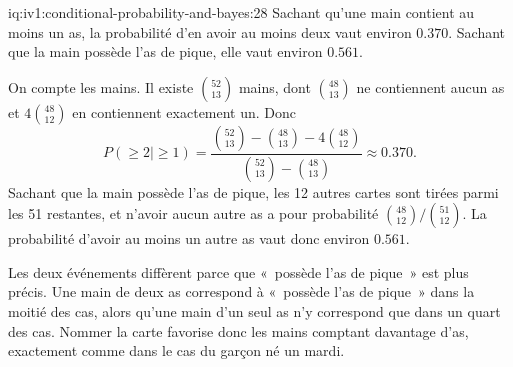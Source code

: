 \begin{solution}{iq:iv1:conditional-probability-and-bayes:28}
Sachant qu'une main contient au moins un as, la probabilité d'en avoir au moins deux vaut environ $0.370$. Sachant que la main possède l'as de pique, elle vaut environ $0.561$.

On compte les mains. Il existe $\binom{52}{13}$ mains, dont $\binom{48}{13}$ ne contiennent aucun as et $4\binom{48}{12}$ en contiennent exactement un. Donc
\[
P(\ge 2 \mid \ge 1) = \frac{\binom{52}{13} - \binom{48}{13} - 4\binom{48}{12}}{\binom{52}{13} - \binom{48}{13}} \approx 0.370.
\]
Sachant que la main possède l'as de pique, les 12 autres cartes sont tirées parmi les 51 restantes, et n'avoir aucun autre as a pour probabilité $\binom{48}{12}/\binom{51}{12}$. La probabilité d'avoir au moins un autre as vaut donc environ $0.561$.

Les deux événements diffèrent parce que «~possède l'as de pique~» est plus précis. Une main de deux as correspond à «~possède l'as de pique~» dans la moitié des cas, alors qu'une main d'un seul as n'y correspond que dans un quart des cas. Nommer la carte favorise donc les mains comptant davantage d'as, exactement comme dans le cas du garçon né un mardi.

\end{solution}


